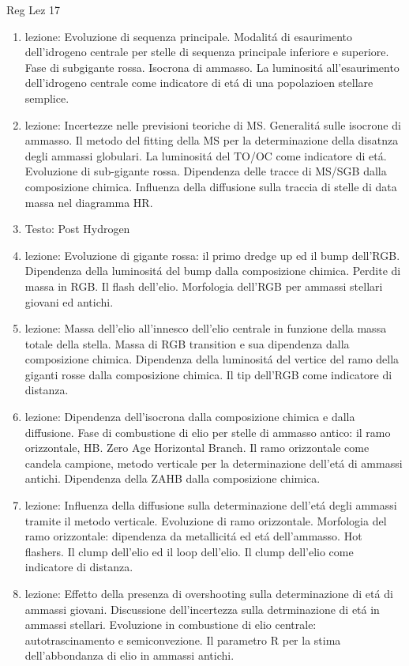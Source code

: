 \begin{frame}[allowframebreaks]{Reg Lez 17}
\begin{enumerate}
\item lezione: Evoluzione di sequenza principale. Modalit\'a di esaurimento dell'idrogeno centrale per stelle di sequenza principale inferiore e superiore. Fase di subgigante rossa. Isocrona di ammasso. La luminosit\'a all'esaurimento dell'idrogeno centrale come indicatore di et\'a di una popolazioen stellare semplice. 
\item lezione: Incertezze nelle previsioni teoriche di MS. Generalit\'a sulle isocrone di ammasso. Il metodo del fitting della MS per la determinazione della disatnza degli ammassi globulari. La luminosit\'a del TO/OC come indicatore di et\'a. Evoluzione di sub-gigante rossa. Dipendenza delle tracce di MS/SGB dalla composizione chimica. Influenza della diffusione sulla traccia di stelle di data massa nel diagramma HR.
\item Testo: Post Hydrogen
\item lezione: Evoluzione di gigante rossa: il primo dredge up ed il bump dell'RGB. Dipendenza della luminosit\'a del bump dalla composizione chimica. Perdite di massa in RGB. Il flash dell'elio. Morfologia dell'RGB per ammassi stellari giovani ed antichi.
\item lezione: Massa dell'elio all'innesco dell'elio centrale in funzione della massa totale della stella. Massa di RGB transition e sua dipendenza dalla composizione chimica. Dipendenza della luminosit\'a del vertice del ramo della giganti rosse dalla composizione chimica. Il tip dell'RGB come indicatore di distanza.
\item lezione: Dipendenza dell'isocrona dalla composizione chimica e dalla diffusione. Fase di combustione di elio per stelle di ammasso antico: il ramo orizzontale, HB. Zero Age Horizontal Branch. Il ramo orizzontale come candela campione, metodo verticale per la determinazione dell'et\'a di ammassi antichi. Dipendenza della ZAHB dalla composizione chimica.
\item lezione: Influenza della diffusione sulla determinazione dell'et\'a degli ammassi tramite il metodo verticale. Evoluzione di ramo orizzontale. Morfologia del ramo orizzontale: dipendenza da metallicit\'a ed et\'a dell'ammasso. Hot flashers. Il clump dell'elio ed il loop dell'elio. Il clump dell'elio come indicatore di distanza.
\item lezione: Effetto della presenza di overshooting sulla determinazione di et\'a di ammassi giovani. Discussione dell'incertezza sulla detrminazione di et\'a in ammassi stellari. Evoluzione in combustione di elio centrale: autotrascinamento e semiconvezione. Il parametro R per la stima dell'abbondanza di elio in ammassi antichi.

\end{enumerate}
\end{frame}
